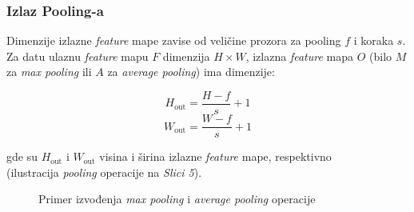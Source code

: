 \documentclass[12pt]{article}
\begin{document}
   \newpage
   \subsubsection*{Izlaz Pooling-a}

   Dimenzije izlazne \textit{feature} mape zavise od veličine prozora za pooling \( f \) i koraka \( s \). 
   Za datu ulaznu \textit{feature} mapu \( F \) dimenzija \( H \times W \), izlazna \textit{feature} mapa \( O \) 
   (bilo \( M \) za \textit{max pooling} ili \( A \) za \textit{average pooling}) ima dimenzije:
   
   \[
   H_{\text{out}} = \frac{H - f}{s} + 1
   \]
   \[
   W_{\text{out}} = \frac{W - f}{s} + 1
   \]
   
   gde su \( H_{\text{out}} \) i \( W_{\text{out}} \) visina i širina izlazne \textit{feature} mape, respektivno \\ (ilustracija \textit{pooling} operacije na \textit{Slici 5}).
   
   
   \begin{figure}[h!]
      \centering
      \vspace{0.5cm} %
      \caption{Primer izvođenja \textit{max pooling} i \textit{average pooling} operacije \cite{pooling}}
      \label{fig:max_avg_pooling}
    \end{figure}

    \newpage
\end{document}
